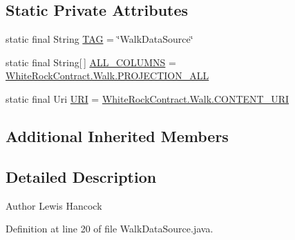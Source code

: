 \subsection*{Static Private Attributes}
\begin{DoxyCompactItemize}
\item 
static final String \hyperlink{classuk_1_1ac_1_1swan_1_1digitaltrails_1_1database_1_1_walk_data_source_a9dcba1107f900092747d2c48a9b39e66}{T\+A\+G} = \char`\"{}Walk\+Data\+Source\char`\"{}
\item 
static final String\mbox{[}$\,$\mbox{]} \hyperlink{classuk_1_1ac_1_1swan_1_1digitaltrails_1_1database_1_1_walk_data_source_af621aeb4a4837dc1cd162b3ec4ba8c4f}{A\+L\+L\+\_\+\+C\+O\+L\+U\+M\+N\+S} = \hyperlink{classuk_1_1ac_1_1swan_1_1digitaltrails_1_1database_1_1_white_rock_contract_1_1_walk_af2c95a7369fa3bc3a3fa7081bdaaac3b}{White\+Rock\+Contract.\+Walk.\+P\+R\+O\+J\+E\+C\+T\+I\+O\+N\+\_\+\+A\+L\+L}
\item 
static final Uri \hyperlink{classuk_1_1ac_1_1swan_1_1digitaltrails_1_1database_1_1_walk_data_source_a25d2abfa8f1fd8a0339f40a83bd9fb89}{U\+R\+I} = \hyperlink{classuk_1_1ac_1_1swan_1_1digitaltrails_1_1database_1_1_white_rock_contract_1_1_walk_a636ef2628c2909ed76334474a941afb2}{White\+Rock\+Contract.\+Walk.\+C\+O\+N\+T\+E\+N\+T\+\_\+\+U\+R\+I}
\end{DoxyCompactItemize}
\subsection*{Additional Inherited Members}


\subsection{Detailed Description}
\begin{DoxyAuthor}{Author}
Lewis Hancock 
\end{DoxyAuthor}


Definition at line 20 of file Walk\+Data\+Source.\+java.



